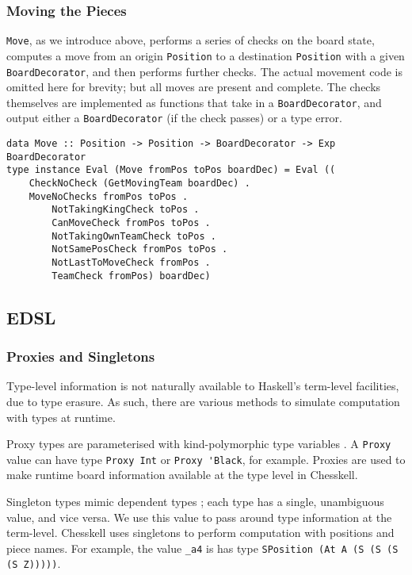 \documentclass[12pt, a4paper, bibliography=totocnumbered]{scrartcl}
\begin{document}
\subsubsection{Moving the Pieces}

\lstinline{Move}, as we introduce above, performs a series of checks on the board state, computes a move from an origin \lstinline{Position} to a destination \lstinline{Position} with a given \lstinline{BoardDecorator}, and then performs further checks. The actual movement code is omitted here for brevity; but all moves are present and complete. The checks themselves are implemented as functions that take in a \lstinline{BoardDecorator}, and output either a \lstinline{BoardDecorator} (if the check passes) or a type error.

\begin{lstlisting}
data Move :: Position -> Position -> BoardDecorator -> Exp BoardDecorator
type instance Eval (Move fromPos toPos boardDec) = Eval ((
    CheckNoCheck (GetMovingTeam boardDec) .
    MoveNoChecks fromPos toPos .
        NotTakingKingCheck toPos .
        CanMoveCheck fromPos toPos .
        NotTakingOwnTeamCheck toPos .
        NotSamePosCheck fromPos toPos .
        NotLastToMoveCheck fromPos .
        TeamCheck fromPos) boardDec)
\end{lstlisting}

\subsection{EDSL}

\subsubsection{Proxies and Singletons}

Type-level information is not naturally available to Haskell's term-level facilities, due to type erasure. As such, there are various methods to simulate computation with types at runtime.

Proxy types are parameterised with kind-polymorphic type variables \cite{yorgey2012giving}. A \lstinline{Proxy} value can have type \lstinline{Proxy Int} or \lstinline{Proxy 'Black}, for example. Proxies are used to make runtime board information available at the type level in Chesskell.

Singleton types mimic dependent types \cite{singletons}; each type has a single, unambiguous value, and vice versa. We use this value to pass around type information at the term-level. Chesskell uses singletons to perform computation with positions and piece names. For example, the value \lstinline{_a4} is has type \lstinline{SPosition (At A (S (S (S (S Z)))))}.
\end{document}

